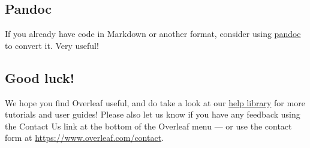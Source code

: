 \documentclass{article}
\begin{document}
\subsection{Pandoc}
If you already have code in Markdown or another format, consider using \href{https://pandoc.org/demos.html}{pandoc} to convert it. Very useful!



\subsection{Good luck!}

We hope you find Overleaf useful, and do take a look at our \href{https://www.overleaf.com/learn}{help library} for more tutorials and user guides! Please also let us know if you have any feedback using the Contact Us link at the bottom of the Overleaf menu --- or use the contact form at \url{https://www.overleaf.com/contact}.




\newpage
\printindex
\end{document}

